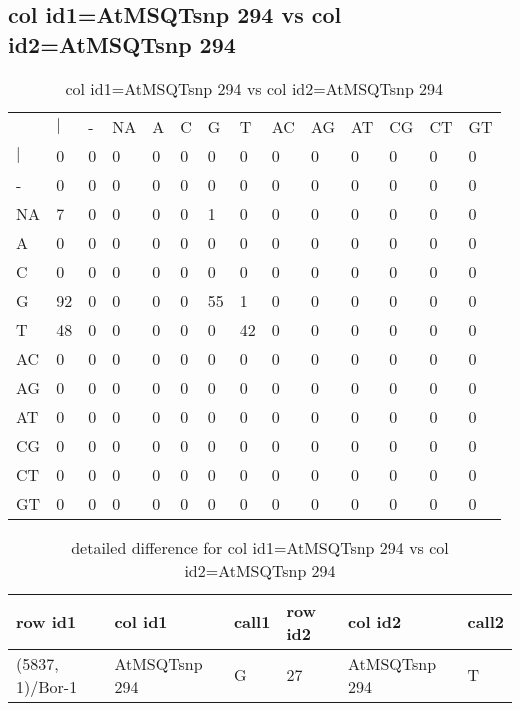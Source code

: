 \subsection{col id1=AtMSQTsnp 294 vs col id2=AtMSQTsnp 294}
\begin{center}
\begin{longtable}{|l|l|l|l|l|l|l|l|l|l|l|l|l|l|}
\caption{col id1=AtMSQTsnp 294 vs col id2=AtMSQTsnp 294} \label{table_dm642}\\
\hline
\\
\hline
&$|$&-&NA&A&C&G&T&AC&AG&AT&CG&CT&GT\\
$|$&0&0&0&0&0&0&0&0&0&0&0&0&0\\
-&0&0&0&0&0&0&0&0&0&0&0&0&0\\
NA&7&0&0&0&0&1&0&0&0&0&0&0&0\\
A&0&0&0&0&0&0&0&0&0&0&0&0&0\\
C&0&0&0&0&0&0&0&0&0&0&0&0&0\\
G&92&0&0&0&0&55&1&0&0&0&0&0&0\\
T&48&0&0&0&0&0&42&0&0&0&0&0&0\\
AC&0&0&0&0&0&0&0&0&0&0&0&0&0\\
AG&0&0&0&0&0&0&0&0&0&0&0&0&0\\
AT&0&0&0&0&0&0&0&0&0&0&0&0&0\\
CG&0&0&0&0&0&0&0&0&0&0&0&0&0\\
CT&0&0&0&0&0&0&0&0&0&0&0&0&0\\
GT&0&0&0&0&0&0&0&0&0&0&0&0&0\\
\hline
\end{longtable}
\end{center}

\begin{center}
\begin{longtable}{|l|l|l|l|l|l|}
\caption{detailed difference for col id1=AtMSQTsnp 294 vs col id2=AtMSQTsnp 294} \label{table_dm643}\\
\hline
row id1&col id1&call1&row id2&col id2&call2\\
\hline
(5837, 1)/Bor-1&AtMSQTsnp 294&G&27&AtMSQTsnp 294&T\\
\hline
\end{longtable}
\end{center}

